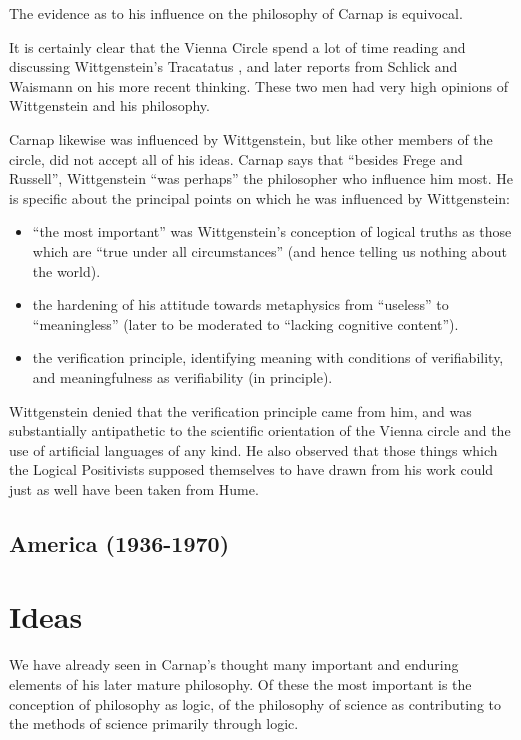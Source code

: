 \documentclass[10pt,titlepage]{book}
\begin{document}
The evidence as to his influence on the philosophy of Carnap is equivocal.

It is certainly clear that the Vienna Circle spend a lot of time reading and discussing Wittgenstein's Tracatatus \cite{wittgenstein1921}, and later reports from Schlick and Waismann  on his more recent thinking.
These two men had very high opinions of Wittgenstein and his philosophy.

Carnap likewise was influenced by Wittgenstein, but like other members of the circle, did not accept all of his ideas.
Carnap says that ``besides Frege and Russell'', Wittgenstein ``was perhaps'' the philosopher who influence him most.
He is specific about the principal points on which he was influenced by Wittgenstein:

\begin{itemize}
\item ``the most important'' was Wittgenstein's conception of logical truths as those which are ``true under all circumstances'' (and hence telling us nothing about the world).
\item  the hardening of his attitude towards metaphysics from ``useless'' to ``meaningless'' (later to be moderated to ``lacking cognitive content'').
\item the verification principle, identifying meaning with conditions of verifiability, and meaningfulness as verifiability (in principle).
\end{itemize}

Wittgenstein denied that the verification principle came from him, and was substantially antipathetic to the scientific orientation of the Vienna circle and the use of artificial languages of any kind.
He also observed that those things which the Logical Positivists supposed themselves to have drawn from his work could just as well have been taken from Hume.

\subsection{America (1936-1970)}

\section{Ideas}

We have already seen in Carnap's thought many important and enduring elements of his later mature philosophy.
Of these the most important is the conception of philosophy as logic, of the philosophy of science as contributing to the methods of science primarily through logic.
\end{document}
